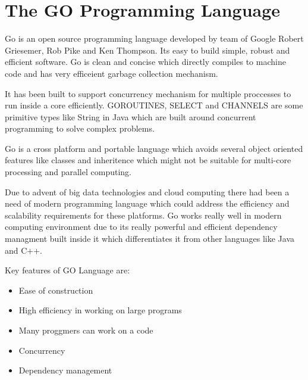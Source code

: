 \section{The GO Programming Language}

Go is an open source programming language developed by team of
Google Robert Griesemer, Rob Pike and Ken Thompson. Its easy to
build simple, robust and efficient software. Go is clean and
concise which directly compiles to machine code and has very
efficeient garbage collection mechanism. 

It has been built to support concurrency mechanism for multiple
proccesses to run inside a core efficiently. GOROUTINES, SELECT
and CHANNELS are some primitive types like String in Java which
are built around concurrent programming to solve complex problems.

Go is a cross platform and portable language which avoids several
object oriented features like classes and inheritence which might
not be suitable for multi-core processing and parallel computing.

Due to advent of big data technologies and cloud computing there
had been a need of modern programming language which could address
the efficiency and scalability requirements for these platforms.
Go works really well in modern computing environment due to its
really powerful and efficient dependency managment built inside it
which differentiates it from other languages like Java and C++.

Key features of GO Language are:

\begin{itemize}
   \item Ease of construction 
   \item High efficiency in working on large programs
   \item Many proggmers can work on a code
   \item Concurrency
   \item Dependency management  
\end{itemize}~\cite{hid-sp18-522-golanguage}



